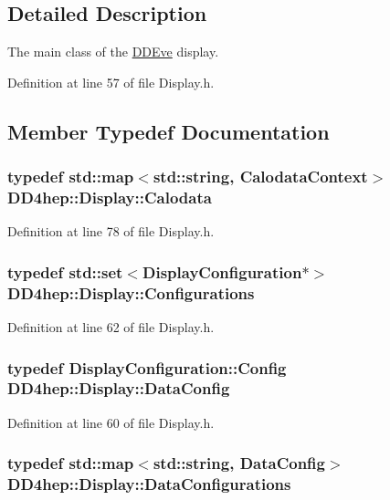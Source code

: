 \subsection{Detailed Description}
The main class of the \hyperlink{struct_d_d4hep_1_1_d_d_eve}{DDEve} display. 

Definition at line 57 of file Display.h.

\subsection{Member Typedef Documentation}
\hypertarget{class_d_d4hep_1_1_display_a692339ace65797a205d2332c4a652598}{
\subsubsection[{Calodata}]{\setlength{\rightskip}{0pt plus 5cm}typedef std::map$<$std::string, {\bf CalodataContext}$>$ {\bf DD4hep::Display::Calodata}}}
\label{class_d_d4hep_1_1_display_a692339ace65797a205d2332c4a652598}


Definition at line 78 of file Display.h.\hypertarget{class_d_d4hep_1_1_display_a6e411e86cfcb41b915d77edf154265dd}{
\subsubsection[{Configurations}]{\setlength{\rightskip}{0pt plus 5cm}typedef std::set$<${\bf DisplayConfiguration}$\ast$$>$ {\bf DD4hep::Display::Configurations}}}
\label{class_d_d4hep_1_1_display_a6e411e86cfcb41b915d77edf154265dd}


Definition at line 62 of file Display.h.\hypertarget{class_d_d4hep_1_1_display_a79237f24a5b3ec781faa5f8e20579ae0}{
\subsubsection[{DataConfig}]{\setlength{\rightskip}{0pt plus 5cm}typedef {\bf DisplayConfiguration::Config} {\bf DD4hep::Display::DataConfig}}}
\label{class_d_d4hep_1_1_display_a79237f24a5b3ec781faa5f8e20579ae0}


Definition at line 60 of file Display.h.\hypertarget{class_d_d4hep_1_1_display_a730a4516989abe8b2f788c8f957e0633}{
\subsubsection[{DataConfigurations}]{\setlength{\rightskip}{0pt plus 5cm}typedef std::map$<$std::string, {\bf DataConfig}$>$ {\bf DD4hep::Display::DataConfigurations}}}
\label{class_d_d4hep_1_1_display_a730a4516989abe8b2f788c8f957e0633}


